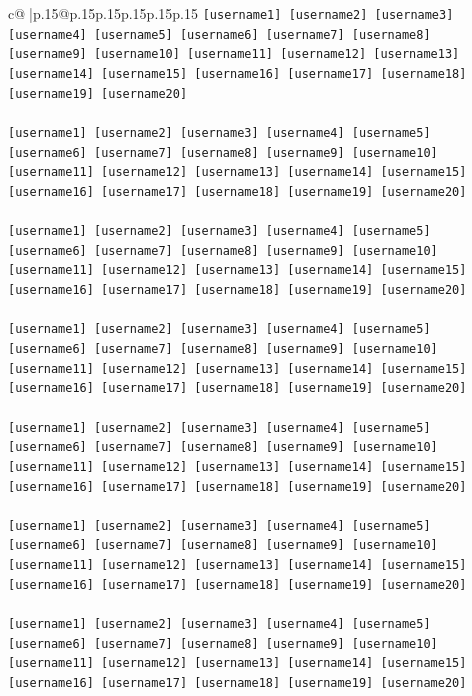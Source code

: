 \documentclass{article}
\begin{document}
{\begin{supertabular}{c@{$\;$}|p{.15\linewidth}@{}p{.15\linewidth}p{.15\linewidth}p{.15\linewidth}p{.15\linewidth}p{.15\linewidth}}
{{{\texttt{{[}username1{]} {[}username2{]} {[}username3{]} {[}username4{]} {[}username5{]} {[}username6{]} {[}username7{]} {[}username8{]} {[}username9{]} {[}username10{]} {[}username11{]} {[}username12{]} {[}username13{]} {[}username14{]} {[}username15{]} {[}username16{]} {[}username17{]} {[}username18{]} {[}username19{]} {[}username20{]}} \\
\\ 
\texttt{{[}username1{]} {[}username2{]} {[}username3{]} {[}username4{]} {[}username5{]} {[}username6{]} {[}username7{]} {[}username8{]} {[}username9{]} {[}username10{]} {[}username11{]} {[}username12{]} {[}username13{]} {[}username14{]} {[}username15{]} {[}username16{]} {[}username17{]} {[}username18{]} {[}username19{]} {[}username20{]}} \\
\\ 
\texttt{{[}username1{]} {[}username2{]} {[}username3{]} {[}username4{]} {[}username5{]} {[}username6{]} {[}username7{]} {[}username8{]} {[}username9{]} {[}username10{]} {[}username11{]} {[}username12{]} {[}username13{]} {[}username14{]} {[}username15{]} {[}username16{]} {[}username17{]} {[}username18{]} {[}username19{]} {[}username20{]}} \\
\\ 
\texttt{{[}username1{]} {[}username2{]} {[}username3{]} {[}username4{]} {[}username5{]} {[}username6{]} {[}username7{]} {[}username8{]} {[}username9{]} {[}username10{]} {[}username11{]} {[}username12{]} {[}username13{]} {[}username14{]} {[}username15{]} {[}username16{]} {[}username17{]} {[}username18{]} {[}username19{]} {[}username20{]}} \\
\\ 
\texttt{{[}username1{]} {[}username2{]} {[}username3{]} {[}username4{]} {[}username5{]} {[}username6{]} {[}username7{]} {[}username8{]} {[}username9{]} {[}username10{]} {[}username11{]} {[}username12{]} {[}username13{]} {[}username14{]} {[}username15{]} {[}username16{]} {[}username17{]} {[}username18{]} {[}username19{]} {[}username20{]}} \\
\\ 
\texttt{{[}username1{]} {[}username2{]} {[}username3{]} {[}username4{]} {[}username5{]} {[}username6{]} {[}username7{]} {[}username8{]} {[}username9{]} {[}username10{]} {[}username11{]} {[}username12{]} {[}username13{]} {[}username14{]} {[}username15{]} {[}username16{]} {[}username17{]} {[}username18{]} {[}username19{]} {[}username20{]}} \\
\\ 
\texttt{{[}username1{]} {[}username2{]} {[}username3{]} {[}username4{]} {[}username5{]} {[}username6{]} {[}username7{]} {[}username8{]} {[}username9{]} {[}username10{]} {[}username11{]} {[}username12{]} {[}username13{]} {[}username14{]} {[}username15{]} {[}username16{]} {[}username17{]} {[}username18{]} {[}username19{]} {[}username20{]}} \\
}}}
\end{supertabular}}
\end{document}
